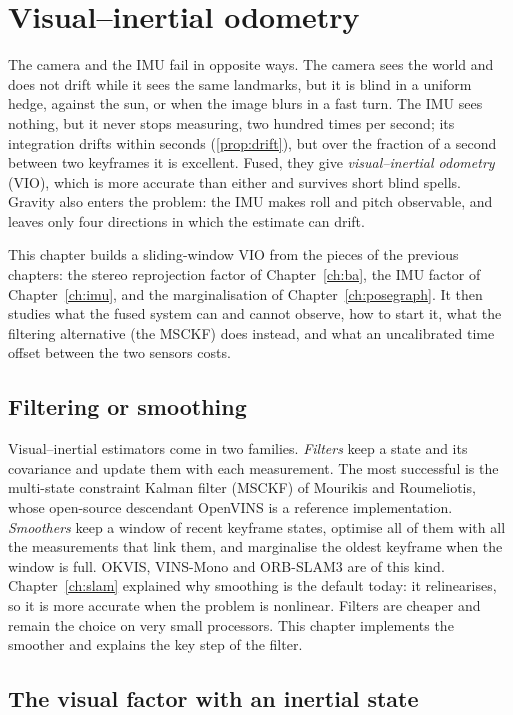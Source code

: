 \chapter{Visual--inertial odometry}
\label{ch:vio}

The camera and the IMU fail in opposite ways. The camera sees the world
and does not drift while it sees the same landmarks, but it is blind in
a uniform hedge, against the sun, or when the image blurs in a fast
turn. The IMU sees nothing, but it never stops measuring, two hundred
times per second; its integration drifts within seconds
(\cref{prop:drift}), but over the fraction of a second between two
keyframes it is excellent. Fused, they give \emph{visual--inertial
odometry} (VIO), which is more accurate than either and survives short
blind spells. Gravity also enters the problem: the IMU makes roll and
pitch observable, and leaves only four directions in which the estimate
can drift.

This chapter builds a sliding-window VIO from the pieces of the previous
chapters: the stereo reprojection factor of Chapter~\ref{ch:ba}, the IMU
factor of Chapter~\ref{ch:imu}, and the marginalisation of
Chapter~\ref{ch:posegraph}. It then studies what the fused system can and
cannot observe, how to start it, what the filtering alternative (the
MSCKF) does instead, and what an uncalibrated time offset between the
two sensors costs.

\section{Filtering or smoothing}

Visual--inertial estimators come in two families. \emph{Filters} keep a
state and its covariance and update them with each measurement. The
most successful is the multi-state constraint Kalman filter (MSCKF) of
Mourikis and Roumeliotis, whose open-source descendant OpenVINS is a
reference implementation. \emph{Smoothers} keep a window of recent
keyframe states, optimise all of them with all the measurements that
link them, and marginalise the oldest keyframe when the window is full.
OKVIS, VINS-Mono and ORB-SLAM3 are of this kind. Chapter~\ref{ch:slam}
explained why smoothing is the default today: it relinearises, so it is
more accurate when the problem is nonlinear. Filters are cheaper and
remain the choice on very small processors. This chapter implements the
smoother and explains the key step of the filter.

\section{The visual factor with an inertial state}

